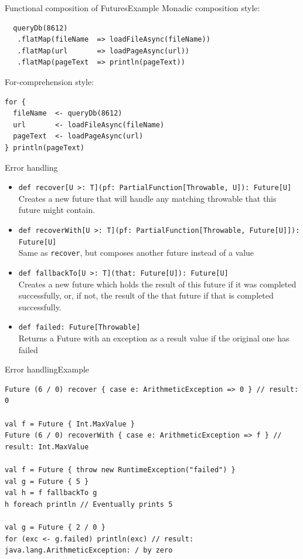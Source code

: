 \documentclass[aspectratio=169]{beamer}
\begin{document}
\begin{frame}[fragile]{Functional composition of Futures}{Example}
Monadic composition style:
\begin{verbatim}
  queryDb(8612)
   .flatMap(fileName  => loadFileAsync(fileName))
   .flatMap(url       => loadPageAsync(url))
   .flatMap(pageText  => println(pageText))
\end{verbatim}
\pause
\bigskip
For-comprehension style:
\begin{verbatim}
for {
  fileName  <- queryDb(8612)
  url       <- loadFileAsync(fileName)
  pageText  <- loadPageAsync(url)
} println(pageText)
\end{verbatim}
\end{frame}

\begin{frame}{Error handling}
  \begin{itemize}
    \item \texttt{def recover[U >: T](pf: PartialFunction[Throwable, U]): Future[U]}\\
      \footnotesize Creates a new future that will handle any matching throwable that this future might contain.
    \item \texttt{def recoverWith[U >: T](pf: PartialFunction[Throwable, Future[U]]): Future[U]}\\
      \footnotesize Same as \texttt{recover}, but composes another future instead of a value
    \item \texttt{def fallbackTo[U >: T](that: Future[U]): Future[U]}\\
      \footnotesize Creates a new future which holds the result of this future if it was completed
      successfully, or, if not, the result of the that future if that is completed successfully.
    \item \texttt{def failed: Future[Throwable]}\\
      \footnotesize Returns a Future with an exception as a result value if the original one has
      failed
  \end{itemize}
\end{frame}

\begin{frame}[fragile]{Error handling}{Example}
\begin{verbatim}
Future (6 / 0) recover { case e: ArithmeticException => 0 } // result: 0

val f = Future { Int.MaxValue }
Future (6 / 0) recoverWith { case e: ArithmeticException => f } // result: Int.MaxValue

val f = Future { throw new RuntimeException("failed") }
val g = Future { 5 }
val h = f fallbackTo g
h foreach println // Eventually prints 5

val g = Future { 2 / 0 }
for (exc <- g.failed) println(exc) // result: java.lang.ArithmeticException: / by zero
\end{verbatim}
\end{frame}
\end{document}

